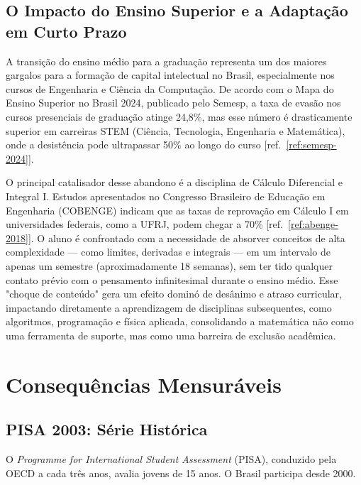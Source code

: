 \documentclass[12pt,a4paper,oneside]{article}
\begin{document}
\subsection{O Impacto do Ensino Superior e a Adaptação em Curto Prazo}
\label{sec:impacto-ensino-superior}

A transição do ensino médio para a graduação representa um dos maiores gargalos para a formação de capital intelectual 
no Brasil, especialmente nos cursos de Engenharia e Ciência da Computação. De acordo com o Mapa do Ensino Superior no 
Brasil 2024, publicado pelo Semesp, a taxa de evasão nos cursos presenciais de graduação atinge 24,8\%, mas esse número é 
drasticamente superior em carreiras STEM (Ciência, Tecnologia, Engenharia e Matemática), onde a desistência pode 
ultrapassar 50\% ao longo do curso [ref.~\ref{ref:semesp-2024}].

O principal catalisador desse abandono é a disciplina de Cálculo Diferencial e Integral I. Estudos apresentados no Congresso 
Brasileiro de Educação em Engenharia (COBENGE) indicam que as taxas de reprovação em Cálculo I em universidades federais, 
como a UFRJ, podem chegar a 70\% [ref.~\ref{ref:abenge-2018}]. O aluno é confrontado com a necessidade de absorver conceitos 
de alta complexidade — como limites, derivadas e integrais — em um intervalo de apenas um semestre (aproximadamente 18 semanas), 
sem ter tido qualquer contato prévio com o pensamento infinitesimal durante o ensino médio. Esse "choque de conteúdo" gera 
um efeito dominó de desânimo e atraso curricular, impactando diretamente a aprendizagem de disciplinas subsequentes, 
como algoritmos, programação e física aplicada, consolidando a matemática não como uma ferramenta de suporte, mas como uma 
barreira de exclusão acadêmica.

\section{Consequências Mensuráveis}

\subsection{PISA 2003: Série Histórica}

O \emph{Programme for International Student Assessment} (PISA),
conduzido pela OECD a cada três anos, avalia jovens de 15 anos. O
Brasil participa desde 2000.
\end{document}

